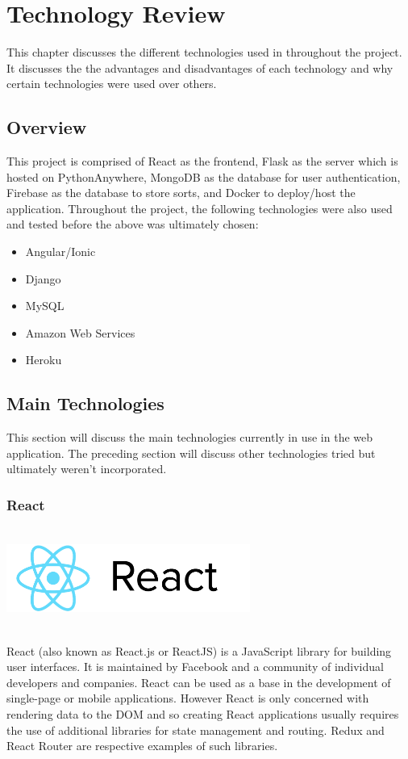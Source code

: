 \chapter{Technology Review}
This chapter discusses the different technologies used in throughout the
project. It discusses the the advantages and disadvantages of each technology 
and why certain technologies were used over others.

\section{Overview}
This project is comprised of React as the frontend, Flask as the server which is
hosted on PythonAnywhere, MongoDB as the database for user authentication, Firebase as the database to store sorts, and Docker to deploy/host the application. Throughout the project, the following technologies were also used 
and tested before the above was ultimately chosen:
\begin{itemize}
    \item Angular/Ionic
    \item Django
    \item MySQL
    \item Amazon Web Services
    \item Heroku
\end{itemize}

\newpage
\section{Main Technologies}
This section will discuss the main technologies currently in use in the web 
application. The preceding section will discuss other technologies tried but 
ultimately weren't incorporated. 

\subsection{React}
\par
\medskip
\begin{center}
    \includegraphics[width=8cm,height=3.3cm,keepaspectratio]{images/react}
\end{center}
React (also known as React.js or ReactJS) is a JavaScript library for building 
user interfaces. It is maintained by Facebook and a community of individual 
developers and companies.
\bigskip
React can be used as a base in the development of single-page or mobile 
applications. However React is only concerned with rendering data to the DOM and
so creating React applications usually requires the use of additional libraries 
for state management and routing. Redux and React Router are respective examples
of such libraries. 

